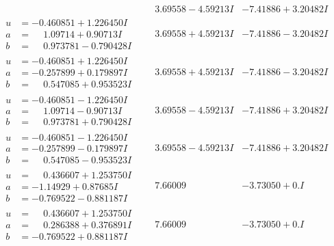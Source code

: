 \documentclass[1p]{elsarticle_modified}
\theoremstyle{definition}
\begin{document}
$$\begin{array}{c|c|c}
 & \phantom{-}3.69558 - 4.59213 I & -7.41886 + 3.20482 I \\ \hline\begin{aligned}
u &= -0.460851 + 1.226450 I \\
a &= \phantom{-}1.09714 + 0.90713 I \\
b &= \phantom{-}0.973781 - 0.790428 I\end{aligned}
 & \phantom{-}3.69558 + 4.59213 I & -7.41886 - 3.20482 I \\ \hline\begin{aligned}
u &= -0.460851 + 1.226450 I \\
a &= -0.257899 + 0.179897 I \\
b &= \phantom{-}0.547085 + 0.953523 I\end{aligned}
 & \phantom{-}3.69558 + 4.59213 I & -7.41886 - 3.20482 I \\ \hline\begin{aligned}
u &= -0.460851 - 1.226450 I \\
a &= \phantom{-}1.09714 - 0.90713 I \\
b &= \phantom{-}0.973781 + 0.790428 I\end{aligned}
 & \phantom{-}3.69558 - 4.59213 I & -7.41886 + 3.20482 I \\ \hline\begin{aligned}
u &= -0.460851 - 1.226450 I \\
a &= -0.257899 - 0.179897 I \\
b &= \phantom{-}0.547085 - 0.953523 I\end{aligned}
 & \phantom{-}3.69558 - 4.59213 I & -7.41886 + 3.20482 I \\ \hline\begin{aligned}
u &= \phantom{-}0.436607 + 1.253750 I \\
a &= -1.14929 + 0.87685 I \\
b &= -0.769522 - 0.881187 I\end{aligned}
 & \phantom{-}7.66009\phantom{ +0.000000I} & -3.73050 + 0. I\phantom{ +0.000000I} \\ \hline\begin{aligned}
u &= \phantom{-}0.436607 + 1.253750 I \\
a &= \phantom{-}0.286388 + 0.376891 I \\
b &= -0.769522 + 0.881187 I\end{aligned}
 & \phantom{-}7.66009\phantom{ +0.000000I} & -3.73050 + 0. I\phantom{ +0.000000I} \\ \hline\begin{aligned}

\end{aligned}
\end{array}$$
\end{document}
